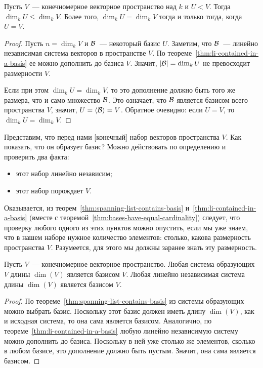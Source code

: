 \begin{proposition}\label{prop:dimension_is_monotonic}
Пусть $V$~--- конечномерное векторное пространство над $k$ и
$U<V$. Тогда $\dim_kU\leq\dim_kV$. Более того, $\dim_kU=\dim_kV$ тогда
и только тогда, когда $U=V$.
\end{proposition}
\begin{proof}
Пусть $n=\dim_kV$ и $\mathcal B$~--- некоторый базис $U$. Заметим, что
$\mathcal B$~--- линейно независимая система векторов в пространстве
$V$. По теореме~\ref{thm:li-contained-in-a-basis} ее можно дополнить
до базиса $V$. Значит, $|\mathcal B| = \dim_k U$ не превосходит размерности $V$.

Если при этом $\dim_kU = \dim_kV$, то это дополнение должно быть того
же размера, что и само множество $\mathcal B$. Это означает,
что $\mathcal B$ является базисом всего пространства $V$,
значит, $U = \langle\mathcal B\rangle = V$. Обратное очевидно: если $U = V$,
то $\dim_k U = \dim_k V$.
\end{proof}

Представим, что перед нами [конечный] набор векторов
пространства $V$. Как показать, что он образует базис?
Можно действовать по определению и проверить два факта:
\begin{itemize}
\item этот набор линейно независим;
\item этот набор порождает $V$.
\end{itemize}
Оказывается, из теорем~\ref{thm:spanning-list-contains-basis}
и~\ref{thm:li-contained-in-a-basis}
(вместе с теоремой~\ref{thm:bases-have-equal-cardinality}) следует, что проверку любого
одного из этих пунктов можно опустить, если мы уже знаем, что
в нашем наборе нужное количество элементов: столько, какова
размерность пространства $V$. Разумеется, для этого мы должны
заранее знать эту размерность.
\begin{proposition}\label{prop:right-dim-implies-basis}
Пусть $V$~--- конечномерное векторное пространство.
Любая система образующих $V$ длины $\dim(V)$ является базисом $V$.
Любая линейно независимая система длины $\dim(V)$ является
базисом $V$.
\end{proposition}
\begin{proof}
По теореме~\ref{thm:spanning-list-contains-basis} из
системы образующих можно выбрать базис. Поскольку этот базис
должен иметь длину $\dim(V)$, как и исходная система, то
она сама является базисом.
Аналогично, по теореме~\ref{thm:li-contained-in-a-basis} любую
линейно независимую систему можно дополнить до базиса.
Поскольку в ней уже
столько же элементов, сколько в любом базисе, это дополнение
должно быть пустым. Значит, она сама является базисом.
\end{proof}

